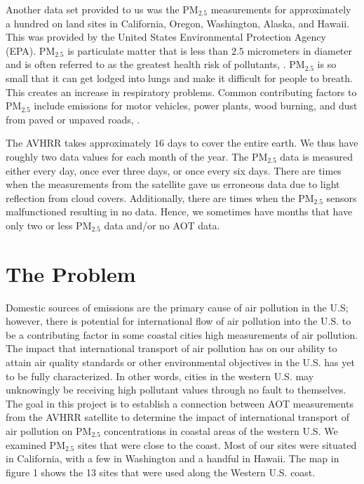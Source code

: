 \documentclass[10pt]{article}
\begin{document}
Another data set provided to us was the PM$_{2.5}$ measurements for approximately a hundred on land sites in California, Oregon, Washington, Alaska, and Hawaii. This was provided by the United States Environmental Protection Agency (EPA). PM$_{2.5}$ is particulate matter that is less than $2.5$ micrometers in diameter and is often referred to as the greatest health risk of pollutants, \cite{epa}.  PM$_{2.5}$ is so small that it can get lodged into lungs and make it difficult for people to breath. This creates an increase in respiratory problems. Common contributing factors to PM$_{2.5}$ include emissions for motor vehicles, power plants, wood burning, and dust from paved or unpaved roads, \cite{epa}.

The AVHRR takes approximately $16$ days to cover the entire earth. We thus have roughly two data values for each month of the year. The PM$_{2.5}$ data is measured either every day, once ever three days, or once every six days. There are times when the measurements from the satellite gave us erroneous data due to light reflection from cloud covers. Additionally, there are times when the PM$_{2.5}$ sensors malfunctioned resulting in no data. Hence, we sometimes have months that have only two or less PM$_{2.5}$ data and/or no AOT data. 

\section{The Problem}
Domestic sources of emissions are the primary cause of air pollution in the U.S; however, there is potential for international flow of air pollution into the U.S. to be a contributing factor in some coastal cities high measurements of air pollution. The impact that international transport of air pollution has on our ability to attain air quality standards or other environmental objectives in the U.S. has yet to be fully characterized. In other words, cities in the western U.S. may unknowingly be receiving high pollutant values through no fault to themselves. The goal in this project is to establish a connection between AOT measurements from the AVHRR satellite to determine the impact of international transport of air pollution on PM$_{2.5}$ concentrations in coastal areas of the western U.S. We examined PM$_{2.5}$ sites that were close to the coast. Most of our sites were situated in California, with a few in Washington and a handful in Hawaii. The map in figure 1 shows the 13 sites that were used along the Western U.S. coast. 
\end{document}
